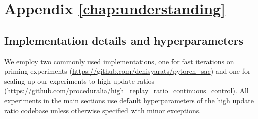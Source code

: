 \chapter{Appendix \autoref{chap:understanding}}

\section{Implementation details and hyperparameters} \label{app:impl}

We employ two commonly used implementations, one for fast iterations on priming experiments (\href{https://github.com/denisyarats/pytorch\_sac}{https://github.com/denisyarats/pytorch\_sac}) and one for scaling up our experiments to high update ratios (\href{https://github.com/proceduralia/high\_replay\_ratio\_continuous\_control}{https://github.com/proceduralia/high\_replay\_ratio\_continuous\_control}). All experiments in the main sections use default hyperparameters of the high update ratio codebase  unless otherwise specified with minor exceptions.

